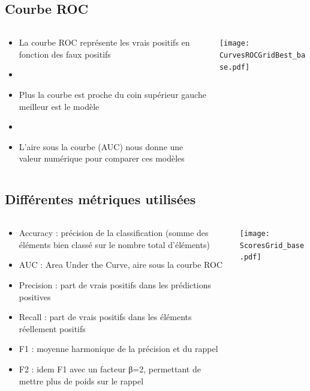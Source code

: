 \documentclass[8pt,aspectratio=169,hyperref={unicode=true}]{beamer}
\begin{document}
\subsection{Courbe ROC}
\begin{frame}{\insertsection}{\insertsubsection}
    \begin{columns}
        \begin{column}{.5\textwidth}
            \begin{itemize}
                \item La courbe ROC représente les vrais positifs en fonction des faux positifs
                \item[]
                \item Plus la courbe est proche du coin supérieur gauche meilleur est le modèle
                \item[]
                \item L'aire sous la courbe (AUC) nous donne une valeur numérique pour comparer ces modèles
            \end{itemize}
        \end{column}
        \begin{column}{.5\textwidth}
            \texttt{[image: CurvesROCGridBest\_base.pdf]}
        \end{column}
    \end{columns}
\end{frame}

\subsection{Différentes métriques utilisées}
\begin{frame}{\insertsection}{\insertsubsection}
    \begin{columns}
        \begin{column}{.5\textwidth}
            \begin{itemize}
                \item Accuracy : précision de la classification (somme des éléments bien classé sur le nombre total d'éléments)
                \item AUC : Area Under the Curve, aire sous la courbe ROC
                \item Precision : part de vrais positifs dans les prédictions positives
                \item Recall : part de vrais positifs dans les éléments réellement positifs
                \item F1 : moyenne harmonique de la précision et du rappel
                \item F2 : idem F1 avec un facteur β=2, permettant de mettre plus de poids sur le rappel
            \end{itemize}
        \end{column}
        \begin{column}{.5\textwidth}
            \texttt{[image: ScoresGrid\_base.pdf]}
        \end{column}
    \end{columns}
\end{frame}
\end{document}
